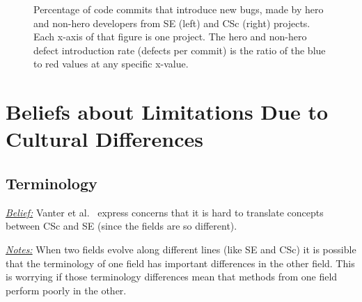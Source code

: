 \documentclass[conference,10pt]{IEEEtran}
\begin{document}
\begin{figure}[!t]
\vspace{-5pt}
\caption{Percentage of code commits that introduce new bugs, made by hero and non-hero developers from SE (left) and CSc (right) projects.
Each x-axis of that figure is one project. The hero and non-hero defect introduction rate (defects per commit) is the ratio of the blue to red values
at any specific x-value.
}\label{fig:heroes}
\vspace{-10pt}
\end{figure}

\section{Beliefs about Limitations Due to Cultural Differences}

\subsection{Terminology}\label{terms}
\noindent \textit{\underline{Belief:}} 
Vanter et al.~\cite{faulk09_secs, easterbrook_cs, boyle09_lessons} express concerns
that it is hard to translate concepts between  CSc and SE (since the fields are so different). 

\noindent \textit{\underline{Notes:}} When two fields evolve along different
lines (like SE and CSc) it is possible that the terminology of one field has important
differences in the other field. This is worrying if those terminology differences mean that methods from one field perform poorly in the other.
\end{document}
